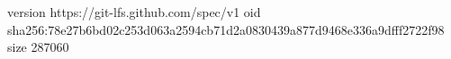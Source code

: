 version https://git-lfs.github.com/spec/v1
oid sha256:78e27b6bd02c253d063a2594cb71d2a0830439a877d9468e336a9dfff2722f98
size 287060
